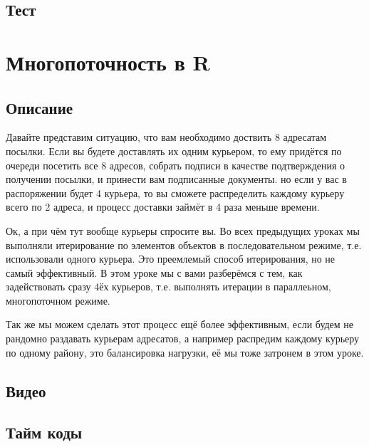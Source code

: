 \documentclass[
]{book}
\begin{document}
\hypertarget{ux442ux435ux441ux442-4}{%
\section{Тест}\label{ux442ux435ux441ux442-4}}

\hypertarget{ux43cux43dux43eux433ux43eux43fux43eux442ux43eux447ux43dux43eux441ux442ux44c-ux432-r}{%
\chapter{Многопоточность в R}\label{ux43cux43dux43eux433ux43eux43fux43eux442ux43eux447ux43dux43eux441ux442ux44c-ux432-r}}

\hypertarget{ux43eux43fux438ux441ux430ux43dux438ux435-5}{%
\section{Описание}\label{ux43eux43fux438ux441ux430ux43dux438ux435-5}}

Давайте представим ситуацию, что вам необходимо доствить 8 адресатам посылки. Если вы будете доставлять их одним курьером, то ему придётся по очереди посетить все 8 адресов, собрать подписи в качестве подтверждения о получении посылки, и принести вам подписанные документы. но если у вас в распоряжении будет 4 курьера, то вы сможете распределить каждому курьеру всего по 2 адреса, и процесс доставки займёт в 4 раза меньше времени.

Ок, а при чём тут вообще курьеры спросите вы. Во всех предыдущих уроках мы выполняли итерирование по элементов объектов в последовательном режиме, т.е. использовали одного курьера. Это преемлемый способ итерирования, но не самый эффективный. В этом уроке мы с вами разберёмся с тем, как задействовать сразу 4ёх курьеров, т.е. выполнять итерации в параллеьном, многопоточном режиме.

Так же мы можем сделать этот процесс ещё более эффективным, если будем не рандомно раздавать курьерам адресатов, а например распредим каждому курьеру по одному району, это балансировка нагрузки, её мы тоже затронем в этом уроке.

\hypertarget{ux432ux438ux434ux435ux43e-5}{%
\section{Видео}\label{ux432ux438ux434ux435ux43e-5}}

\hypertarget{ux442ux430ux439ux43c-ux43aux43eux434ux44b-5}{%
\section{Тайм коды}\label{ux442ux430ux439ux43c-ux43aux43eux434ux44b-5}}
\end{document}
